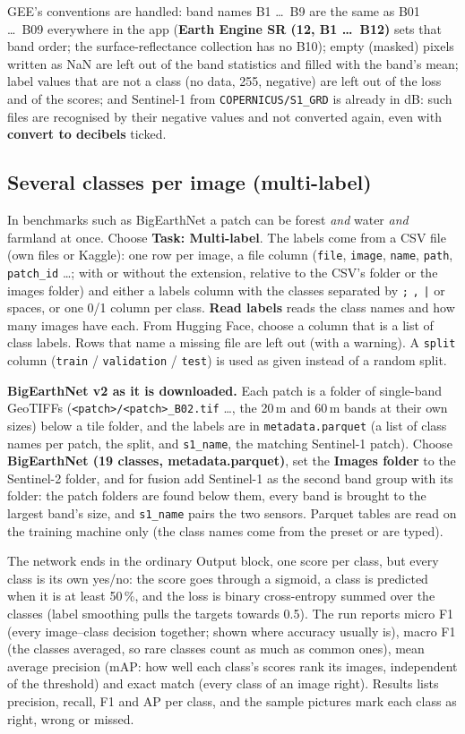 \documentclass[11pt,a4paper]{article}
\newcommand{\ui}[1]{\textbf{\textsf{#1}}}
\newcommand{\file}[1]{\texttt{#1}}
\begin{document}
GEE's conventions are handled: band names B1 \dots\ B9 are the same as B01 \dots\ B09 everywhere in the app (\ui{Earth Engine SR (12,
B1 \dots\ B12)} sets that band order; the surface-reflectance collection has no B10); empty (masked) pixels written as NaN are left out
of the band statistics and filled with the band's mean; label values that are not a class (no data, 255, negative) are left out of the
loss and of the scores; and Sentinel-1 from \texttt{COPERNICUS/S1\_GRD} is already in dB: such files are recognised by their negative
values and not converted again, even with \ui{convert to decibels} ticked.

\subsection{Several classes per image (multi-label)}
\label{sec:multilabel}
In benchmarks such as BigEarthNet a patch can be forest \emph{and} water \emph{and} farmland at once. Choose \ui{Task: Multi-label}.
The labels come from a CSV file (own files or Kaggle): one row per image, a file column (\texttt{file}, \texttt{image}, \texttt{name},
\texttt{path}, \texttt{patch\_id} \dots; with or without the extension, relative to the CSV's folder or the images folder) and either a
labels column with the classes separated by \texttt{;} \texttt{,} \texttt{|} or spaces, or one 0/1 column per class. \ui{Read labels}
reads the class names and how many images have each. From Hugging Face, choose a column that is a list of class labels. Rows that name
a missing file are left out (with a warning). A \texttt{split} column (\texttt{train} / \texttt{validation} / \texttt{test}) is used as
given instead of a random split.

\textbf{BigEarthNet v2 as it is downloaded.} Each patch is a folder of single-band GeoTIFFs (\file{<patch>/<patch>\_B02.tif} \dots, the
20\,m and 60\,m bands at their own sizes) below a tile folder, and the labels are in \file{metadata.parquet} (a list of class names per
patch, the split, and \texttt{s1\_name}, the matching Sentinel-1 patch). Choose \ui{BigEarthNet (19 classes, metadata.parquet)}, set the
\ui{Images folder} to the Sentinel-2 folder, and for fusion add Sentinel-1 as the second band group with its folder: the patch folders are
found below them, every band is brought to the largest band's size, and \texttt{s1\_name} pairs the two sensors. Parquet tables are read
on the training machine only (the class names come from the preset or are typed).

The network ends in the ordinary Output block, one score per class, but every class is its own yes/no: the score goes through a sigmoid,
a class is predicted when it is at least 50\,\%, and the loss is binary cross-entropy summed over the classes (label smoothing pulls the
targets towards 0.5). The run reports micro F1 (every image--class decision together; shown where accuracy usually is), macro F1 (the
classes averaged, so rare classes count as much as common ones), mean average precision (mAP: how well each class's scores rank its
images, independent of the threshold) and exact match (every class of an image right). Results lists precision, recall, F1 and AP per
class, and the sample pictures mark each class as right, wrong or missed.
\end{document}
